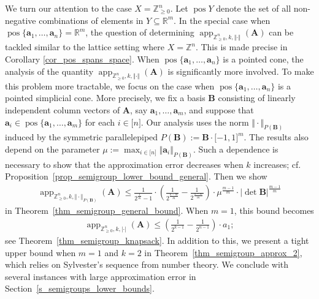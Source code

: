 \documentclass[pdflatex]{sn-jnl}
\DeclareMathOperator{\app}{app}
\DeclareMathOperator{\pos}{pos}
\newcommand{\R}{\mathbb{R}}
\newcommand{\Z}{\mathbb{Z}}
\newcommand{\bA}{\bm{A}}
\newcommand{\ba}{\bm{a}}
\newcommand{\bB}{\bm{B}}
\theoremstyle{thmstyleone}%
\theoremstyle{thmstyletwo}%
\theoremstyle{thmstylethree}%
\begin{document}
	We turn our attention to the case $X = \Z^n_{\geq 0}$. Let $\pos Y$ denote the set of all non-negative combinations of elements in $Y\subseteq\R^m$. 
	In the special case when $\pos\lbrace \ba_1,\ldots,\ba_n\rbrace=\R^m$, the question of determining $\app_{\Z^n_{\geq 0},k,\Vert\cdot\Vert}(\bA)$ can be tackled similar to the lattice setting where $X =\Z^n$. This is made precise in Corollary \ref{cor_pos_spans_space}. 
	When $\pos\lbrace\ba_1,\ldots,\ba_n\rbrace$ is a pointed cone, the analysis of the quantity $\app_{\Z^n_{\geq 0},k,\Vert\cdot\Vert}(\bA)$ is significantly more involved. To make this problem more tractable, we focus on the case when $\pos\lbrace\ba_1,\ldots,\ba_n\rbrace$ is a pointed simplicial cone. 
	More precisely, we fix a basis $\bB$ consisting of linearly independent column vectors of $\bA$, say
	$\ba_1,\ldots,\ba_m$, and suppose that
	$\ba_i\in\pos\lbrace \ba_1,\ldots,\ba_m\rbrace$ for each $i\in\lbrack
	n\rbrack$. 
	Our analysis uses the norm $\Vert\cdot\Vert_{P(\bB)}$ induced by the symmetric
	parallelepiped $P(\bB) := \bB\cdot \lbrack -1,1 \rbrack^m$. 
	The results also depend on the parameter $\mu :=\max_{i\in\lbrack n\rbrack}\Vert\ba_i\Vert_{P(\bB)}$. Such a dependence is necessary to show that the approximation error decreases when $k$ increases; cf. Proposition~\ref{prop_semigroup_lower_bound_general}. 
	Then we show 
	\begin{align*}
		\app_{\Z^n_{\geq 0}, k, \Vert\cdot\Vert_{P(\bB)}}(\bA)\leq \frac{1}{2^{\frac{1}{m}} - 1}\cdot \left(\frac{1}{2^{\frac{k-m}{m}}} - \frac{1}{2^{\frac{n-m}{m}}}\right)\cdot \mu^{\frac{m-1}{m}}\cdot \left|\det\bB\right|^{\frac{m-1}{m}}
	\end{align*}
	in Theorem~\ref{thm_semigroup_general_bound}. When $m=1$, this bound becomes
	\begin{align*}
		\app_{\Z^n_{\geq 0}, k, |\cdot|}(\bA)\leq \left(\frac{1}{2^{k-1}} - \frac{1}{2^{n-1}}\right)\cdot a_1;
	\end{align*} 
	see Theorem~\ref{thm_semigroup_knapsack}. In addition to this, we present a tight upper bound when $m = 1$ and $k = 2$ in Theorem~\ref{thm_semigroup_approx_2}, which relies on Sylvester's sequence from number theory. We conclude with several instances with large approximation error in Section~\ref{s_semigroups_lower_bounds}.
	
\end{document}
